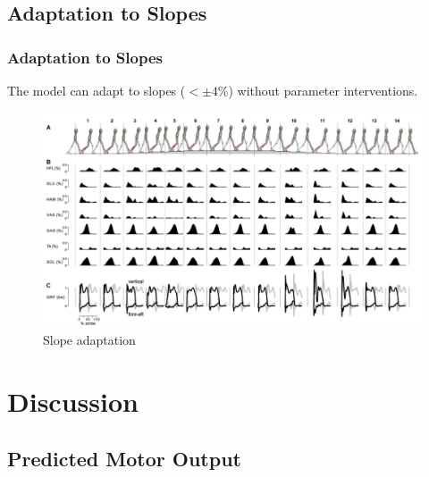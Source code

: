 \documentclass[10pt]{beamer}
\begin{document}
\subsection[Results]{Adaptation to Slopes}

\begin{frame}
	\frametitle{Adaptation to Slopes}
	
	The model can adapt to slopes ($ < \pm 4\% $) without parameter interventions.
	
	\begin{figure}
		\centering
		\includegraphics[height=.65\textheight]{images/slope_adaptation.pdf}
		\caption{Slope adaptation}	
	\end{figure}
	
\end{frame}

\section{Discussion}

\subsection[Results]{Predicted Motor Output}
\end{document}
